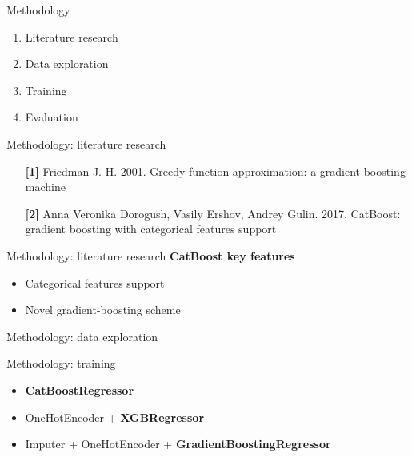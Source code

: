 \begin{frame}{Methodology}
	\begin{enumerate}
		\item Literature research
		\item Data exploration
		\item Training
		\item Evaluation
	\end{enumerate}
\end{frame}

\begin{frame}{Methodology: literature research}
	\begin{enumerate}
		\item[\textbf{[1]}] Friedman J. H. 2001. Greedy function approximation: a gradient boosting machine
		\item[\textbf{[2]}] Anna Veronika Dorogush, Vasily Ershov, Andrey Gulin. 2017. CatBoost: gradient boosting with categorical features support
	\end{enumerate}
\end{frame}

\begin{frame}{Methodology: literature research}
	\textbf{CatBoost key features}
	\begin{itemize}
		\item Categorical features support
		\item Novel gradient-boosting scheme
	\end{itemize}
\end{frame}

\begin{frame}{Methodology: data exploration}
	\begin{table}
		\centering
	\end{table}
\end{frame}

\begin{frame}{Methodology: training}
	\begin{itemize}
		\item \textbf{CatBoostRegressor}
		\item OneHotEncoder + \textbf{XGBRegressor}
		\item Imputer + OneHotEncoder + \textbf{GradientBoostingRegressor}
	\end{itemize}
	
\end{frame}

